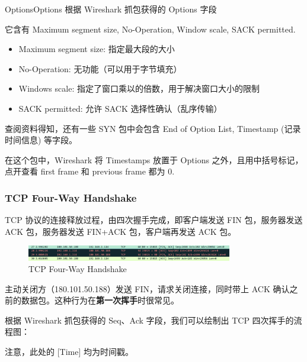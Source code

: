 \documentclass[14pt,a4paper,UTF8,twoside]{article}
\begin{document}
\begin{ans}{Options}{Options}
根据 Wireshark 抓包获得的 Options 字段

它含有 Maximum segment size, No-Operation, Window scale, SACK permitted.

\begin{itemize}
	\item Maximum segment size: 指定最大段的大小
	\item No-Operation: 无功能（可以用于字节填充）
	\item Windows scale: 指定了窗口乘以的倍数，用于解决窗口大小的限制
	\item SACK permitted: 允许 SACK 选择性确认（乱序传输）
\end{itemize}

查阅资料得知，还有一些 SYN 包中会包含 End of Option List, Timestamp (记录时间信息) 等字段。

在这个包中，Wireshark 将 Timestamps 放置于 Options 之外，且用中括号标记，点开查看 first frame 和 previous frame 都为 0.

\end{ans}

\subsubsection{TCP Four-Way Handshake}

TCP 协议的连接释放过程，由四次握手完成，即客户端发送 FIN 包，服务器发送 ACK 包，服务器发送 FIN+ACK 包，客户端再发送 ACK 包。

\begin{figure}[H]
	\centering
	\includegraphics[width=0.8\textwidth]{lab6/FIN.png}
	\caption{TCP Four-Way Handshake}
\end{figure}

主动关闭方（180.101.50.188）发送 FIN，请求关闭连接，同时带上 ACK 确认之前的数据包。这种行为在\textbf{第一次挥手}时很常见。

根据 Wireshark 抓包获得的 Seq、Ack 字段，我们可以绘制出 TCP 四次挥手的流程图：

注意，此处的 [Time] 均为时间戳。
\end{document}
